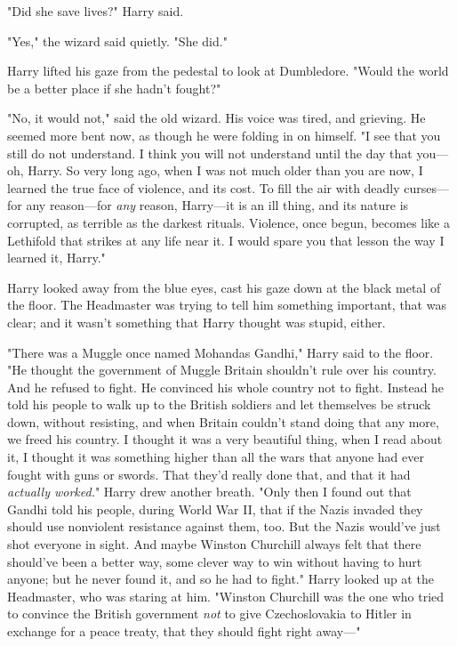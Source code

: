 "Did she save lives?" Harry said.

"Yes," the wizard said quietly. "She did."

Harry lifted his gaze from the pedestal to look at Dumbledore. "Would the world
be a better place if she hadn't fought?"

"No, it would not," said the old wizard. His voice was tired, and grieving. He
seemed more bent now, as though he were folding in on himself. "I see that you
still do not understand. I think you will not understand until the day that
you—oh, Harry. So very long ago, when I was not much older than you are now,
I learned the true face of violence, and its cost. To fill the air with deadly
curses—for any reason—for \emph{any} reason, Harry—it is an ill thing,
and its nature is corrupted, as terrible as the darkest rituals. Violence, once
begun, becomes like a Lethifold that strikes at any life near it. I{\el}
would spare you that lesson the way I learned it, Harry."

Harry looked away from the blue eyes, cast his gaze down at the black metal of
the floor. The Headmaster was trying to tell him something important, that was
clear; and it wasn't something that Harry thought was stupid, either.

"There was a Muggle once named Mohandas Gandhi," Harry said to the floor. "He
thought the government of Muggle Britain shouldn't rule over his country. And
he refused to fight. He convinced his whole country not to fight. Instead he
told his people to walk up to the British soldiers and let themselves be struck
down, without resisting, and when Britain couldn't stand doing that any more,
we freed his country. I thought it was a very beautiful thing, when I read
about it, I thought it was something higher than all the wars that anyone had
ever fought with guns or swords. That they'd really done that, and that it had
\emph{actually worked.}" Harry drew another breath. "Only then I found out that
Gandhi told his people, during World War II, that if the Nazis invaded they
should use nonviolent resistance against them, too. But the Nazis would've just
shot everyone in sight. And maybe Winston Churchill always felt that there
should've been a better way, some clever way to win without having to hurt
anyone; but he never found it, and so he had to fight." Harry looked up at the
Headmaster, who was staring at him. "Winston Churchill was the one who tried to
convince the British government \emph{not} to give Czechoslovakia to Hitler in
exchange for a peace treaty, that they should fight right away—"

